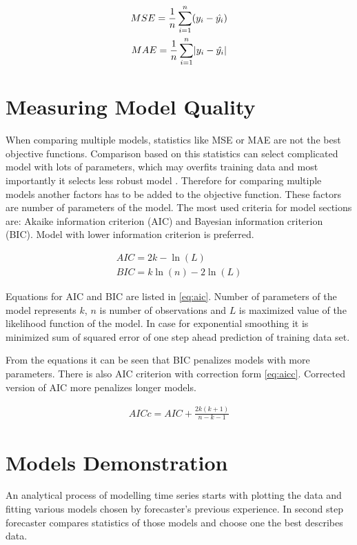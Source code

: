     \begin{gather} \label{eq:accuracy-mse}
         MSE = \frac{1}{n} \sum_{i=1}^{n}(y_i - \hat{y_i}) \\
         MAE = \frac{1}{n} \sum_{i=1}^{n} \abs{y_i - \hat{y_i}} \label{eq:accuracy-mae}
    \end{gather}

    \section{Measuring Model Quality} \label{sec:model-quality}
    When comparing multiple models, statistics like MSE or MAE are not the best objective functions. Comparison
    based on this statistics can select complicated model with lots of parameters, which may overfits training data
    and most importantly it selects less robust model \cite{cipra}. Therefore for comparing multiple models another
    factors has to be added to the objective function. These factors are number of parameters of the model. The
    most used criteria for model sections are: Akaike information criterion (AIC) and Bayesian information
    criterion (BIC). Model with lower information criterion is preferred.

    \begin{gather} \label{eq:aic}
        AIC = 2 k - \ln(L) \\ \nonumber
        BIC = k \ln(n) - 2 \ln(L)
    \end{gather}

    Equations for AIC and BIC are listed in \ref{eq:aic}. Number of parameters of the model represents $k$, $n$ is
    number of observations and $L$ is maximized value of the likelihood function of the model. In case for exponential
    smoothing it is minimized sum of squared error of one step ahead prediction of training data set.

    From the equations it can be seen that BIC penalizes models with more parameters. There is also AIC criterion with
    correction form \ref{eq:aicc}. Corrected version of AIC more penalizes longer models.

    \begin{eqnarray} \label{eq:aicc}
        AICc = AIC + \frac{2k(k+1)}{n-k-1}
    \end{eqnarray}

    \section{Models Demonstration} \label{sec:models-demonstration}
    An analytical process of modelling time series starts with plotting the data and fitting various models chosen by
    forecaster's previous experience. In second step forecaster compares statistics of those models and choose one the
    best describes data.

